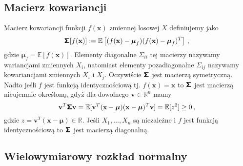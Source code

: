 \documentclass{myclass}
\begin{document}
\subsection{Macierz kowariancji}

Macierz kowariancji funkcji \(f(\mathbf{x})\) zmiennej losowej \(X\) definiujemy jako
\begin{equation*}
    \boldsymbol{\mathsf{\Sigma}}[f(\mathbf{x})] := \mathbb{E}\left[(f(\mathbf{x}) - \boldsymbol{\mu}_f)(f(\mathbf{x}) - \boldsymbol{\mu}_f)^T\right]\,,
\end{equation*}
gdzie \(\boldsymbol{\mu}_f = \mathbb{E}[f(\mathbf{x})]\). Elementy diagonalne
\(\mathsf{\Sigma}_{ii}\) tej macierzy nazywamy wariancjami zmiennych \(X_i\), natomiast elementy
pozadiagonalne \(\mathsf{\Sigma}_{ij}\) nazywamy kowariancjami zmiennych \(X_i\) i \(X_j\).
Oczywiście \(\boldsymbol{\mathsf{\Sigma}}\) jest macierzą symetryczną. Nadto jeśli \(f\) jest funkcją
identycznościową tj. \(f(\mathbf{x}) = \mathbf{x}\) to \(\boldsymbol{\mathsf{\Sigma}}\) jest macierzą nieujemnie
określoną, gdyż dla dowolnego \(\mathbf{v} \in \mathbb{R}^n\) mamy
\begin{equation*}
    \mathbf{v}^T \boldsymbol{\mathsf{\Sigma}} \mathbf{v} = \mathbb{E}[\mathbf{v}^T (\mathbf{x} - \boldsymbol{\mu})(\mathbf{x} - \boldsymbol{\mu})^T \mathbf{v}] = \mathbb{E}[z^2] \geq 0\,,
\end{equation*}
gdzie \(z = \mathbf{v}^T (\mathbf{x} - \boldsymbol{\mu}) \in \mathbb{R}\). Jeśli \(X_1, \ldots,
X_n\) są niezależne i \(f\) jest funkcją identycznościową to \(\boldsymbol{\mathsf{\Sigma}}\) jest macierzą
diagonalną.

\subsection{Wielowymiarowy rozkład normalny}
\end{document}
